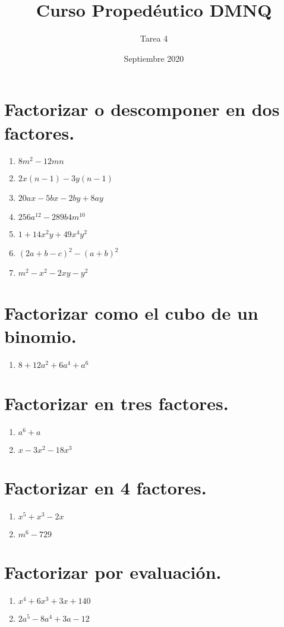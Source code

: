 \documentclass{article}
\title{Curso Propedéutico DMNQ}
\author{Tarea 4}
\date{Septiembre 2020}
\begin{document}
\maketitle

\section*{Factorizar o descomponer en dos factores.}

\begin{enumerate}
    \item $8m^2 - 12mn$
    \item $2x(n - 1) - 3y(n - 1)$
    \item $ 20ax - 5bx - 2by + 8ay$
    \item $ 256a^{12} - 289b4m^{10}$
    \item $ 1 + 14x^2y + 49x^4y^2$
    \item $  (2a + b - c)^2 - (a + b)^2$
    \item $m^2 - x^2 - 2xy - y^2$
\end{enumerate}

\section*{Factorizar como el cubo de un binomio.}

\begin{enumerate}
    \item $8 + 12a^2 + 6a^4 + a^6$
\end{enumerate}

\section*{Factorizar en tres factores.}

\begin{enumerate}
    \item $a^6 + a$
    \item $ x - 3x^2 - 18x^3$
\end{enumerate}


\section*{Factorizar en 4 factores.}

\begin{enumerate}
    \item $x^5 + x^3 - 2x$
    \item $m^6 - 729$
\end{enumerate}


\section*{Factorizar por evaluación.}

\begin{enumerate}
    \item $x^4 + 6x^3 + 3x + 140$ 
    \item $2a^5 - 8a^4 + 3a - 12$
\end{enumerate}

 
\end{document}
